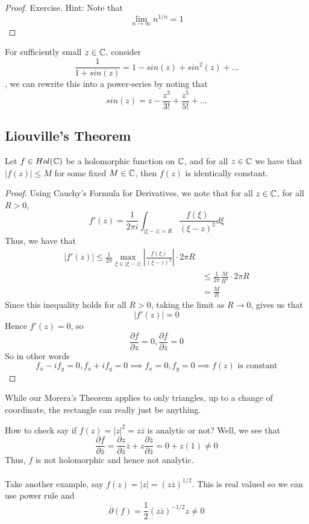 \begin{proof}
    Exercise. Hint: Note that
    \[\lim_{n \to \infty} n^{1/n} = 1\]
\end{proof}

\begin{example}
    For sufficiently small $z \in \mathbb{C}$, consider
    \[\frac{1}{1 + sin(z)} = 1 - sin(z) + sin^2(z) + ...\]
    , we can rewrite this into a power-series by noting that
    \[sin(z) = z - \frac{z^3}{3!} + \frac{z^5}{5!} + ...\]
\end{example}

\subsection{Liouville's Theorem}

\begin{theorem}
    Let $f \in Hol(\mathbb{C})$ be a holomorphic function on $\mathbb{C}$, and for all $z \in \mathbb{C}$ we have that $|f(z)| \leq M$ for some fixed $M \in \mathbb{C}$, then $f(z)$ is identically constant.
\end{theorem}

\begin{proof}
Using Cauchy's Formula for Derivatives, we note that for all $z \in \mathbb{C}$, for all $R > 0$,
\[f'(z) = \frac{1}{2\pi i} \int_{|\xi - z| = R} \frac{f(\xi)}{(\xi - z)^2} d\xi\]
Thus, we have that
\begin{align*}
    |f'(z)| \leq \frac{1}{2\pi} \max_{\xi \in |\xi - z|} |\frac{f(\xi)}{(\xi - z)^2}| \cdot 2 \pi R\\
    &\leq \frac{1}{2\pi} \frac{M}{R^2} \cdot 2 \pi R \tag*{Since $f$ is bounded}\\
    &= \frac{M}{R}
\end{align*}
Since this inequality holds for all $R > 0$, taking the limit as $R \to 0$, gives us that
\[|f'(z)| = 0\]
Hence $f'(z) = 0$, so
\[\frac{\partial f}{\partial z} = 0, \frac{\partial f}{\partial \overline{z}} = 0\]
So in other words
\[f_x - i f_y = 0, f_x + i f_y = 0 \implies f_x = 0, f_y = 0 \implies f(z) \text{ is constant}\]
\end{proof}

\begin{remark}
    While our Morera's Theorem applies to only triangles, up to a change of coordinate, the rectangle can really just be anything.
\end{remark}

\begin{remark}
    How to check say if $f(z) = |z|^2 = z \overline{z}$ is analytic or not? Well, we see that
    \[\frac{\partial f}{\partial \overline{z}} = \frac{\partial z}{\partial \overline{z}} \overline{z} + z \frac{\partial \overline{z}}{\partial \overline{z}} = 0 + z(1) \neq 0\]
    Thus, $f$ is not holomorphic and hence not analytic.\\\\
    Take another example, say $f(z) = |z| = (z \overline{z})^{1/2}$. This is real valued so we can use power rule and
    \[\overline{\partial}(f) = \frac{1}{2}(z \overline{z})^{-1/2} z \neq 0\]
\end{remark}

